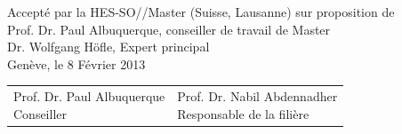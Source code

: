 \begin{titlepage}
\noindent
{Accept{\'e} par la HES-SO//Master (Suisse, Lausanne) sur proposition de} \\[1cm]
{Prof. Dr. Paul Albuquerque, conseiller de travail de Master} \\
{Dr. Wolfgang H{\"o}f\/le, Expert principal} \\[5cm]
{Gen{\`eve}, le 8 F{\'e}vrier 2013}\\ [5cm]
\begin{tabular}{ll}
    \parbox{7cm}{
        Prof. Dr. Paul Albuquerque\\
        Conseiller
    } &
    \parbox{5cm} {
        Prof. Dr. Nabil Abdennadher\\
        Responsable de la fili{\`e}re
    } \\ [3cm]
\end{tabular}
\end{titlepage}